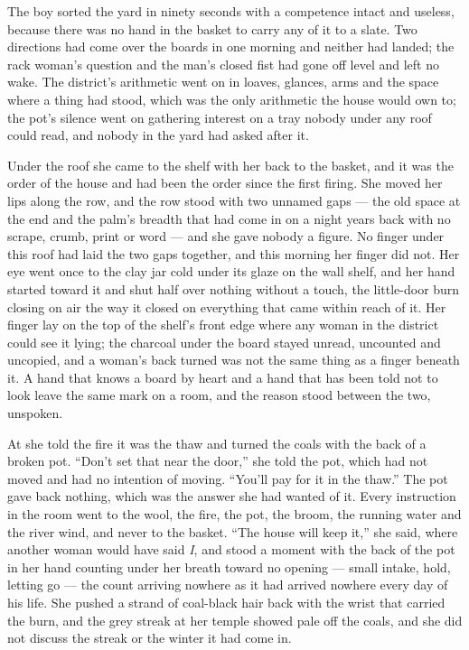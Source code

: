 The boy sorted the yard in ninety seconds with a competence intact and useless, because there was no hand in the basket to carry any of it to a slate. Two directions had come over the boards in one morning and neither had landed; the rack woman's question and the man's closed fist had gone off level and left no wake. The district's arithmetic went on in loaves, glances, arms and the space where a thing had stood, which was the only arithmetic the house would own to; the pot's silence went on gathering interest on a tray nobody under any roof could read, and nobody in the yard had asked after it.

\scenebreak

Under the roof she came to the shelf with her back to the basket, and it was the order of the house and had been the order since the first firing. She moved her lips along the row, and the row stood with two unnamed gaps --- the old space at the end and the palm's breadth that had come in on a night years back with no scrape, crumb, print or word --- and she gave nobody a figure. No finger under this roof had laid the two gaps together, and this morning her finger did not. Her eye went once to the clay jar cold under its glaze on the wall shelf, and her hand started toward it and shut half over nothing without a touch, the little-door burn closing on air the way it closed on everything that came within reach of it. Her finger lay on the top of the shelf's front edge where any woman in the district could see it lying; the charcoal under the board stayed unread, uncounted and uncopied, and a woman's back turned was not the same thing as a finger beneath it. A hand that knows a board by heart and a hand that has been told not to look leave the same mark on a room, and the reason stood between the two, unspoken.

At  she told the fire it was the thaw and turned the coals with the back of a broken pot. “Don't set that near the door,” she told the pot, which had not moved and had no intention of moving. “You'll pay for it in the thaw.” The pot gave back nothing, which was the answer she had wanted of it. Every instruction in the room went to the wool, the fire, the pot, the broom, the running water and the river wind, and never to the basket. “The house will keep it,” she said, where another woman would have said \emph{I}, and stood a moment with the back of the pot in her hand counting under her breath toward no opening --- small intake, hold, letting go --- the count arriving nowhere as it had arrived nowhere every day of his life. She pushed a strand of coal-black hair back with the wrist that carried the burn, and the grey streak at her temple showed pale off the coals, and she did not discuss the streak or the winter it had come in.

